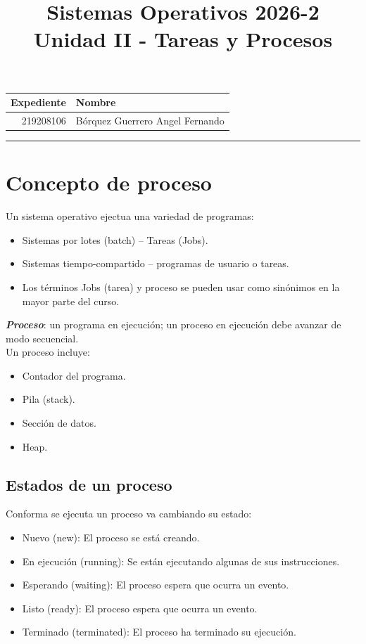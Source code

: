 \documentclass[a4paper, 11pt]{article}
\title
{
    Sistemas Operativos 2026-2 \\
    Unidad II - Tareas y Procesos
}
\begin{document}
\maketitle

\begin{center}
    \begin{tabular}{r|l}
        \textbf{Expediente} & \textbf{Nombre} \\ \hline
        219208106 & Bórquez Guerrero Angel Fernando \\
    \end{tabular}
\end{center}

\rule{\linewidth}{0.3mm}

\vspace{0.3cm}
\section{Concepto de proceso}
Un sistema operativo ejectua una variedad de programas:
\begin{itemize}
    \item Sistemas por lotes (batch) -- Tareas (Jobs).
    \item Sistemas tiempo-compartido -- programas de usuario o tareas.
    \item Los términos Jobs (tarea) y proceso se pueden usar como sinónimos en la mayor parte del curso.
\end{itemize} \par

\textsl{\textbf{Proceso}}: un programa en ejecución; un proceso en ejecución debe avanzar de modo secuencial. \\
Un proceso incluye:
\begin{itemize}
    \item Contador del programa.
    \item Pila (stack).
    \item Sección de datos.
    \item Heap.
\end{itemize}

\subsection{Estados de un proceso}
Conforma se ejecuta un proceso va cambiando su estado:
\begin{itemize}
    \item Nuevo (new): El proceso se está creando.
    \item En ejecución (running): Se están ejecutando algunas de sus instrucciones.
    \item Esperando (waiting): El proceso espera que ocurra un evento.
    \item Listo (ready): El proceso espera que ocurra un evento.
    \item Terminado (terminated): El proceso ha terminado su ejecución.
\end{itemize}
\end{document}
